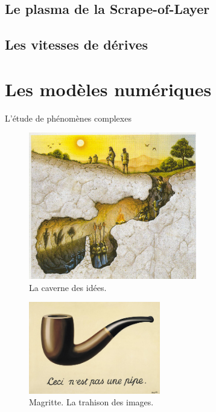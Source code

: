 		\subsection{Le plasma de la Scrape-of-Layer}
		\subsection{Les vitesses de dérives}
		\label{vitessesDerive}
	\section{Les modèles numériques}
		L'étude de phénomènes complexes
		\begin{figure}[htbp]
			\centering
			\includegraphics[height=64mm]{figures/cave.jpg}
			{\caption{La caverne des idées.}\label{caverne}}
		\end{figure}
		\begin{figure}[htbp]

			\includegraphics[height=40mm]{figures/Magritte.jpg}
			{\caption{Magritte. La trahison des images.}\label{magritte}}
		\end{figure}


	
	

		